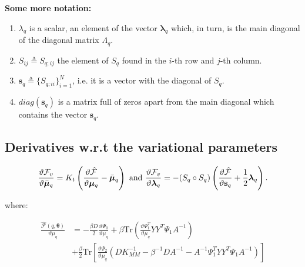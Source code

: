 \textbf{Some more notation:} 
\begin{enumerate}
\item $\lambda_q$ is a scalar, an element of the vector $\boldsymbol \lambda_q$ which, in turn, is the main diagonal of the diagonal matrix $\Lambda_q$. 
\item $S_{ij} \triangleq S_{q;ij}$ the element of $S_q$ found in the $i$-th row and $j$-th column.
\item $\mathbf{s}_q \triangleq \lbrace S_{q;ii} \rbrace_{i=1}^N$, i.e. it is a vector with the diagonal of $S_q$.
\item $diag(\mathbf{s}_q)$ is a matrix full of zeros apart from the main diagonal which contains the vector $\mathbf{s}_q$.
\end{enumerate}

\subsection{Derivatives w.r.t the variational parameters}
\begin{equation}
    \label{derivVarParamSuppl}
\frac{\vartheta \mathcal{F}_v}{\vartheta \bar{\boldsymbol \mu}_q} 
=  K_t \left( \frac{\vartheta \hat{\mathcal{F}}}{\vartheta \boldsymbol \mu_q} - \bar{\boldsymbol \mu}_q \right)
\text{ and }
 \frac{\vartheta \mathcal{F}_v}{\vartheta \boldsymbol \lambda_q}
= - ( S_q \circ S_q) \left( \frac{\vartheta \hat{\mathcal{F}}}{\vartheta \mathbf{s}_q} + \frac{1}{2} \boldsymbol \lambda_q \right).
\end{equation}

where:

\begin{align}
 \frac{\hat{\mathcal{F}}(q, \boldsymbol \theta)}{\vartheta \mu_q}
{}& = - \frac{\beta D}{2} \frac{\vartheta \Psi_0}{\vartheta \mu_q}
    + \beta \text{Tr} \left(\frac{\vartheta \Psi_1^T}{\vartheta \mu_q} Y Y^T \Psi_1 A^{-1} \right) \nonumber \\
{}& + \frac{\beta}{2} \text{Tr} \left[ \frac{\vartheta \Psi_2}{\vartheta \mu_q}
       \left(
	  D K_{MM}^{-1} - \beta^{-1} D A^{-1} - A^{-1} \Psi_1^T Y Y^T \Psi_1 A^{-1}
       \right) \right] \label{derivFTildeEfficientComputationMu}
\end{align}


